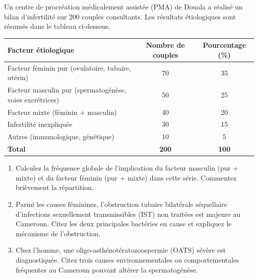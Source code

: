 \documentclass[11pt]{article}
\begin{document}
\begin{exercice}
Un centre de procréation médicalement assistée (PMA) de Douala a réalisé un bilan d'infertilité sur 200 couples consultants. Les résultats étiologiques sont résumés dans le tableau ci-dessous.

\begin{center}
\begin{tabular}{|l|c|c|}
\hline
\textbf{Facteur étiologique} & \textbf{Nombre de couples} & \textbf{Pourcentage (\%)} \\
\hline
Facteur féminin pur (ovulatoire, tubaire, utérin) & 70 & 35 \\
Facteur masculin pur (spermatogénèse, voies excrétrices) & 50 & 25 \\
Facteur mixte (féminin + masculin) & 40 & 20 \\
Infertilité inexpliquée & 30 & 15 \\
Autres (immunologique, génétique) & 10 & 5 \\
\hline
\textbf{Total} & \textbf{200} & \textbf{100} \\
\hline
\end{tabular}
\end{center}

\begin{enumerate}
    \item Calculez la fréquence globale de l'implication du facteur masculin (pur + mixte) et du facteur féminin (pur + mixte) dans cette série. Commentez brièvement la répartition.
    \item Parmi les causes féminines, l'obstruction tubaire bilatérale séquellaire d'infections sexuellement transmissibles (IST) non traitées est majeure au Cameroun. Citez les deux principales bactéries en cause et expliquez le mécanisme de l'obstruction.
    \item Chez l'homme, une oligo-asthénotératozoospermie (OATS) sévère est diagnostiquée. Citez trois causes environnementales ou comportementales fréquentes au Cameroun pouvant altérer la spermatogénèse.
\end{enumerate}
\end{exercice}
\end{document}
